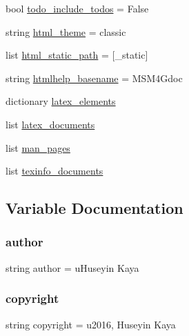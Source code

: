 \begin{DoxyCompactItemize}
\item 
bool \hyperlink{namespaceconf_a9c7a99d15e14d10286285d3e49eeb704}{todo\+\_\+include\+\_\+todos} = False
\item 
string \hyperlink{namespaceconf_ae3cdb5291b613a54e31ca9520cddb940}{html\+\_\+theme} = \textquotesingle{}classic\textquotesingle{}
\item 
list \hyperlink{namespaceconf_a0a3ed65f01f948fea22a3928be863e0f}{html\+\_\+static\+\_\+path} = \mbox{[}\textquotesingle{}\+\_\+static\textquotesingle{}\mbox{]}
\item 
string \hyperlink{namespaceconf_a75a82d2191ce50cef1a4b6522da3c148}{htmlhelp\+\_\+basename} = \textquotesingle{}M\+S\+M4\+Gdoc\textquotesingle{}
\item 
dictionary \hyperlink{namespaceconf_a271e3f105e3929daf675adc46f5027e6}{latex\+\_\+elements}
\item 
list \hyperlink{namespaceconf_a19ce49f2838fb86624dc2d34e023baca}{latex\+\_\+documents}
\item 
list \hyperlink{namespaceconf_a09bebc3ead6c7c1acf6823c7a5609155}{man\+\_\+pages}
\item 
list \hyperlink{namespaceconf_a122461edc71af89e490ec6c7c71b8a0f}{texinfo\+\_\+documents}
\end{DoxyCompactItemize}


\subsection{Variable Documentation}
\hypertarget{namespaceconf_ab873cebb3b7e47db4fe59837d1aaa210}{}\label{namespaceconf_ab873cebb3b7e47db4fe59837d1aaa210} 
\subsubsection{\texorpdfstring{author}{author}}
{\footnotesize\ttfamily string author = u\textquotesingle{}Huseyin Kaya\textquotesingle{}}

\hypertarget{namespaceconf_a6ad5f3290c14149f679301b770fa13f9}{}\label{namespaceconf_a6ad5f3290c14149f679301b770fa13f9} 
\subsubsection{\texorpdfstring{copyright}{copyright}}
{\footnotesize\ttfamily string copyright = u\textquotesingle{}2016, Huseyin Kaya\textquotesingle{}}

